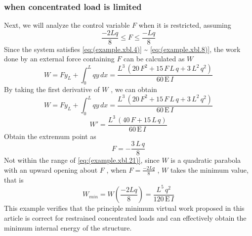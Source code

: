 \subsubsection {when concentrated load is limited}
Next, we will analyze the control variable $ F $ when it is restricted, assuming
\begin{equation}\label{eq:(example.xbl.21)}
\frac{-2Lq}{8}\leq F\leq \frac{-Lq}{8}
\end{equation}
Since the system satisfies \ref{eq:(example.xbl.4)} \~{} \ref{eq:(example.xbl.8)}, the work done by an external force containing $ F $ can be calculated as $ W$ 
\begin{equation}\label{eq:(example.xbl.22)}
W=Fy_{L}+\int_{0}^ {L}qy \,dx
=\frac{L^3 \,{\left(20\,F^2 +15\,F\,L\,q+3\,L^2 \,q^2 \right)}}{60\,\textrm{E}\,I }
\end{equation}
By taking the first derivative of $ W $ , we can obtain
\begin{equation}\label{eq:(example.xbl.23)}
W=Fy_{L}+\int_{0}^ {L}qy \,dx
=\frac{L^3 \,{\left(20\,F^2 +15\,F\,L\,q+3\,L^2 \,q^2 \right)}}{60\,\textrm{E}\,I }
\end{equation}
\begin{equation}\label{eq:(example.xbl.24)}
W'=\frac{L^3 \,{\left(40\,F+15\,L\,q\right)}}{60\,\textrm{E}\,I }
\end{equation}
Obtain the extremum point as
\begin{equation}\label{eq:(example.xbl.25)}
F=-\frac{3\,L\,q}{8}
\end{equation}
Not within the range of \ref{eq:(example.xbl.21)}, since $ W $ is a quadratic parabola with an upward opening about $ F $ , when $ F=\frac {-2Lq} {8}$  , $ W $ takes the minimum value, that is
\begin{equation}\label{eq:(example.xbl.26)}
W_{min}=W(\frac{-2Lq}{8})=\frac{L^5 \,q^2 }{120\,\textrm{E}\,I }
\end{equation}
This example verifies that the principle minimum virtual work proposed in this article is correct for restrained concentrated loads and can effectively obtain the minimum internal energy of the structure.
